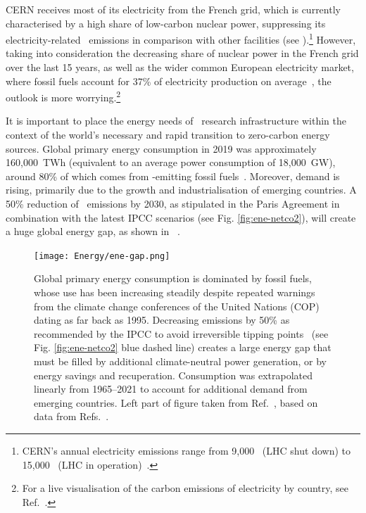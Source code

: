\documentclass[../SustainableHEP.tex]{subfiles}
\begin{document}
CERN receives most of its electricity from the French grid, which is currently characterised by a high share of low-carbon nuclear power, suppressing its electricity-related \CdO\ emissions in comparison with other facilities  (see ).\footnote{CERN's annual electricity emissions range from 9,000 \tCdOe\ (LHC shut down) to 15,000 \tCdOe\ (LHC in operation)~\cite{Environment:2737239}.} However, taking into consideration the decreasing share of nuclear power in the French grid over the last 15 years, as well as the wider common European electricity market, where fossil fuels account for 37\% of electricity production on average~\cite{BPReport}, the outlook is more worrying.\footnote{For a live visualisation of the carbon emissions of electricity by country, see Ref.~\cite{ElectricityMap}.}

It is important to place the energy needs of \ACR\ research infrastructure within the context of the world's necessary and rapid transition to zero-carbon energy sources. Global primary energy consumption in 2019 was approximately 160,000~TWh (equivalent to an average power consumption of 18,000~GW), around 80\% of which comes from \CdO-emitting fossil fuels~\cite{OWDfuels}. Moreover, demand is rising, primarily due to the growth and industrialisation of emerging countries.  A 50\% reduction of \CdO\ emissions by 2030, as stipulated in the Paris Agreement in combination with the latest IPCC scenarios (see Fig. \ref{fig:ene-netco2}), will create a huge global energy gap, as shown in ~\cite{physikkonkret}. 


\begin{figure}[!ht]
     \centering
    \texttt{[image: Energy/ene-gap.png]}     
    \caption[Primary energy consumption is dominated by fossil fuels]%
        {Global primary energy consumption is dominated by fossil fuels, whose use has been increasing steadily despite repeated warnings from the climate change conferences of the United Nations (COP) dating as far back as 1995. Decreasing emissions by 50\% as recommended by the IPCC to avoid irreversible tipping points~\cite{OECDTippingPoints} (see Fig. \ref{fig:ene-netco2} blue dashed line) creates a large energy gap that must be filled by additional climate-neutral power generation, or by energy savings and recuperation. Consumption was extrapolated linearly from 1965--2021 to account for additional demand from emerging countries. Left part of figure taken from Ref.~\cite{OWDgap}, based on data from Refs.~\cite{Smil,BP2022}.\label{fig:ene-gap}}
 \end{figure}
\end{document}
